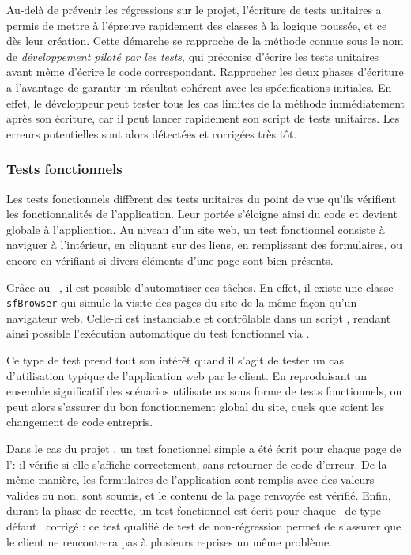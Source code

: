 Au-delà de prévenir les régressions sur le projet, l'écriture de tests unitaires a permis de mettre à l'épreuve rapidement des classes à la logique poussée, et ce dès leur création. Cette démarche se rapproche de la méthode connue sous le nom de \emph{développement piloté par les tests}, qui préconise d'écrire les tests unitaires avant même d'écrire le code correspondant. Rapprocher les deux phases d'écriture a l'avantage de garantir un résultat cohérent avec les spécifications initiales. En effet, le développeur peut tester tous les cas limites de la méthode immédiatement après son écriture, car il peut lancer rapidement son script de tests unitaires. Les erreurs potentielles sont alors détectées et corrigées très tôt.


\subsubsection{Tests fonctionnels}

Les tests fonctionnels diffèrent des tests unitaires du point de vue qu'ils vérifient les fonctionnalités de l'application. Leur portée s'éloigne ainsi du code et devient globale à l'application. Au niveau d'un site web, un test fonctionnel consiste à naviguer à l'intérieur, en cliquant sur des liens, en remplissant des formulaires, ou encore en vérifiant si divers éléments d'une page sont bien présents.

Grâce au \afm\ \asf, il est possible d'automatiser ces tâches. En effet, il existe une classe \texttt{sfBrowser} qui simule la visite des pages du site de la même façon qu'un navigateur web. Celle-ci est instanciable et contrôlable dans un script \aphp, rendant ainsi possible l'exécution automatique du test fonctionnel via \asismo.

Ce type de test prend tout son intérêt quand il s'agit de tester un cas d'utilisation typique de l'application web par le client. En reproduisant un ensemble significatif des scénarios utilisateurs sous forme de tests fonctionnels, on peut alors s'assurer du bon fonctionnement global du site, quels que soient les changement de code entrepris.

Dans le cas du projet \aey, un test fonctionnel simple a été écrit pour chaque page de l'\aintranet : il vérifie si elle s'affiche correctement, sans retourner de code d'erreur. De la même manière, les formulaires de l'application sont remplis avec des valeurs valides ou non, sont soumis, et le contenu de la page renvoyée est vérifié. Enfin, durant la phase de recette, un test fonctionnel est écrit pour chaque \abug\ de type \og défaut \fg\ corrigé : ce test qualifié de test de non-régression permet de s'assurer que le client ne rencontrera pas à plusieurs reprises un même problème. 

